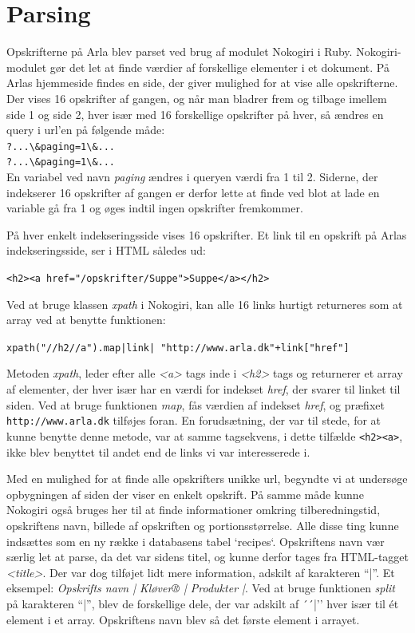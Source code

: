 \section{Parsing}
Opskrifterne på Arla blev parset ved brug af modulet Nokogiri i Ruby. Nokogiri-modulet gør det let at finde værdier af forskellige elementer i et dokument. På Arlas hjemmeside findes en side, der giver mulighed for at vise alle opskrifterne. Der vises 16 opskrifter af gangen, og når man bladrer frem og tilbage imellem side 1 og side 2, hver især med 16 forskellige opskrifter på hver, så ændres en query i url'en på følgende måde: \\
\lstinline{?...\&paging=1\&...} \\
\lstinline{?...\&paging=1\&...} \\
En variabel ved navn \textit{paging} ændres i queryen værdi fra 1 til 2. Siderne, der indekserer 16 opskrifter af gangen er derfor lette at finde ved blot at lade en variable gå fra 1 og øges indtil ingen opskrifter fremkommer.

På hver enkelt indekseringsside vises 16 opskrifter. Et link til en opskrift på Arlas indekseringsside, ser i HTML således ud:

\lstinline{<h2><a href="/opskrifter/Suppe">Suppe</a></h2>}

Ved at bruge klassen \textit{xpath} i Nokogiri, kan alle 16 links hurtigt returneres som at array ved at benytte funktionen:

\texttt{xpath("//h2//a").map{|link| "http://www.arla.dk"+link["href"]}}

Metoden \textit{xpath}, leder efter alle \textit{<a>} tags inde i \textit{<h2>} tags og returnerer et array af elementer, der hver især har en værdi for indekset \textit{href}, der svarer til linket til siden. Ved at bruge funktionen \textit{map}, fås værdien af indekset \textit{href}, og præfixet \texttt{http://www.arla.dk} tilføjes foran. En forudsætning, der var til stede, for at kunne benytte denne metode, var at samme tagsekvens, i dette tilfælde \lstinline{<h2><a>}, ikke blev benyttet til andet end de links vi var interesserede i.

Med en mulighed for at finde alle opskrifters unikke url, begyndte vi at undersøge opbygningen af siden der viser en enkelt opskrift.
På samme måde kunne Nokogiri også bruges her til at finde informationer omkring tilberedningstid, opskriftens navn, billede af opskriften og portionsstørrelse. Alle disse ting kunne indsættes som en ny række i databasens tabel `recipes`. Opskriftens navn vær særlig let at parse, da det var sidens titel, og kunne derfor tages fra HTML-tagget \textit{<title>}. Der var dog tilføjet lidt mere information, adskilt af karakteren ``|''. Et eksempel: \textit{Opskrifts navn | Kløver® | Produkter |}. Ved at bruge funktionen \textit{split} på karakteren ``|'', blev de forskellige dele, der var adskilt af ´´|'' hver især til ét element i et array. Opskriftens navn blev så det første element i arrayet.

